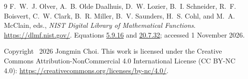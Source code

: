\documentclass[11pt]{article}
\theoremstyle{definition}
\theoremstyle{remark}
\begin{document}
\begin{thebibliography}{9}
F.~W.~J. Olver, A.~B. Olde Daalhuis, D.~W. Lozier, B.~I. Schneider,
R.~F. Boisvert, C.~W. Clark, B.~R. Miller, B.~V. Saunders, H.~S. Cohl,
and M.~A. McClain, eds.,
\emph{NIST Digital Library of Mathematical Functions}.
\url{https://dlmf.nist.gov/}.
Equations \href{https://dlmf.nist.gov/5.9.E16}{5.9.16} and
\href{https://dlmf.nist.gov/20.7.E32}{20.7.32}; accessed 1 November 2026.
\end{thebibliography}

\medskip
\noindent\small Copyright \textcopyright\ 2026 Jongmin Choi.
This work is licensed under the Creative Commons Attribution-NonCommercial
4.0 International License (CC BY-NC 4.0):
\url{https://creativecommons.org/licenses/by-nc/4.0/}.
\end{document}

